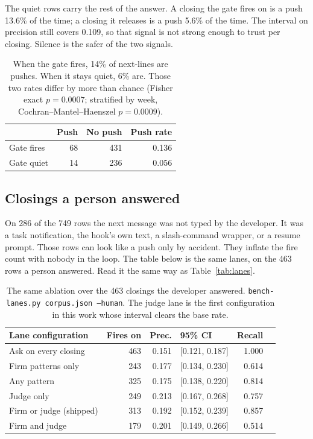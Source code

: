 The quiet rows carry the rest of the answer. A closing the gate fires on
is a push 13.6\% of the time; a closing it releases is a push 5.6\% of
the time. The interval on precision still covers 0.109, so that signal
is not strong enough to trust per closing. Silence is the safer of the
two signals.

\begin{table}[ht]
\centering
\begin{tabular}{lrrr}
\toprule
 & Push & No push & Push rate \\
\midrule
Gate fires & 68 & 431 & 0.136 \\
Gate quiet & 14 & 236 & 0.056 \\
\bottomrule
\end{tabular}
\caption{When the gate fires, 14\% of next-lines are pushes. When it
stays quiet, 6\% are. Those two rates differ by more than chance
(Fisher exact $p = 0.0007$; stratified by week,
Cochran--Mantel--Haenszel $p = 0.0009$).}
\label{tab:assoc}
\end{table}

\subsection{Closings a person answered}

On 286 of the 749 rows the next message was not typed by the developer.
It was a task notification, the hook's own text, a slash-command wrapper,
or a resume prompt. Those rows can look like a push only by accident.
They inflate the fire count with nobody in the loop. The table below is
the same lanes, on the 463 rows a person answered. Read it the same way
as Table~\ref{tab:lanes}.

\begin{table}[ht]
\centering
\begin{tabular}{lrrlrr}
\toprule
Lane configuration & Fires on & Prec. & 95\% CI & Recall \\
\midrule
Ask on every closing & 463 & 0.151 & [0.121, 0.187] & 1.000 \\
\midrule
Firm patterns only & 243 & 0.177 & [0.134, 0.230] & 0.614 \\
Any pattern & 325 & 0.175 & [0.138, 0.220] & 0.814 \\
Judge only & 249 & 0.213 & [0.167, 0.268] & 0.757 \\
Firm or judge (shipped) & 313 & 0.192 & [0.152, 0.239] & 0.857 \\
Firm and judge & 179 & 0.201 & [0.149, 0.266] & 0.514 \\
\bottomrule
\end{tabular}
\caption{The same ablation over the 463 closings the developer answered.
\texttt{bench-lanes.py corpus.json --human}. The judge lane is the first
configuration in this work whose interval clears the base rate.}
\label{tab:human}
\end{table}

